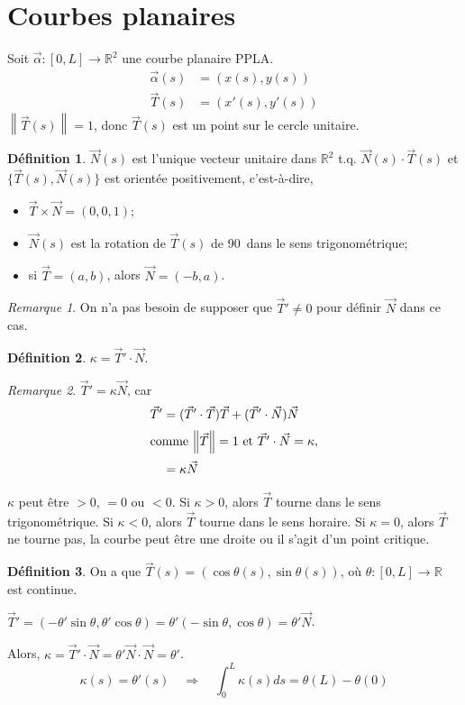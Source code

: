 \documentclass{report}
\theoremstyle{definition}
\newtheorem*{dfn}{D\'efinition}
\theoremstyle{remark}
\newtheorem*{rmq}{Remarque}
\def\RR{\mathbb{R}}
\newcommand*{\norme}[1]{\left\|#1\right\|}
\begin{document}
	\section{Courbes planaires}
	Soit $\vec\alpha:[0,L]\to\RR^2$ une courbe planaire PPLA.
	\begin{align*}
		\vec\alpha(s)&= (x(s), y(s))\\
		\vec T(s)&= (x'(s), y'(s))
	\end{align*}
	$\norme{\vec T(s)}=1$, donc $\vec T(s)$ est un point sur le cercle unitaire.

	\begin{dfn}
		$\vec N(s)$ est l'unique vecteur unitaire dans $\RR^2$ t.q. $\vec N(s) \cdot \vec T(s)$ et $\{\vec T(s), \vec N(s)\}$ est orient\'ee positivement, c'est-\`a-dire,
		\begin{itemize}
			\item $\vec T \times \vec N=(0,0,1)$;
			\item $\vec N(s)$ est la rotation de $\vec T(s)$ de 90\degree\ dans le sens trigonom\'etrique;
			\item si $\vec T=(a,b)$, alors $\vec N=(-b,a)$.
		\end{itemize}
	\end{dfn}

	\begin{rmq}
		On n'a pas besoin de supposer que $\vec T'\neq0$ pour d\'efinir $\vec N$ dans ce cas.
	\end{rmq}

	\begin{dfn}
		$\kappa=\vec T' \cdot \vec N$.
	\end{dfn}

	\begin{rmq}
		$\vec T'=\kappa\vec N$, car
		\begin{align*}
			\vec T'&= (\vec T' \cdot \vec T)\vec T + (\vec T' \cdot \vec N)\vec N\\
			\shortintertext{comme $\norme{\vec T}=1$ et $\vec T' \cdot \vec N=\kappa$,}
			&= \kappa\vec N
		\end{align*}
	\end{rmq}

	$\kappa$ peut \^etre $>0$, $=0$ ou $<0$. Si $\kappa>0$, alors $\vec T$ tourne dans le sens trigonom\'etrique. Si $\kappa<0$, alors $\vec T$ tourne dans le sens horaire. Si $\kappa=0$, alors $\vec T$ ne tourne pas, la courbe peut \^etre une droite ou il s'agit d'un point critique.

	\begin{dfn}
		On a que $\vec T(s) = (\cos\theta(s), \sin\theta(s))$, o\`u $\theta:[0,L]\to\RR$ est continue.

		$\vec T' = (-\theta'\sin\theta, \theta'\cos\theta) = \theta'(-\sin\theta, \cos\theta) = \theta'\vec N$.

		Alors, $\kappa = \vec T' \cdot \vec N = \theta'\vec N \cdot \vec N = \theta'$.
		\[ \kappa(s) = \theta'(s) \quad\Longrightarrow\quad \int_{0}^{L}\kappa(s) ds = \theta(L)-\theta(0)\]
	\end{dfn}
\end{document}
